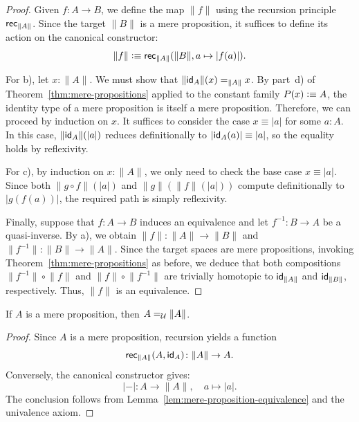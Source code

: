 \begin{proof}
    Given $f\colon A\to B$, we define the map $\lVert f\rVert$ using the recursion principle $\mathsf{rec}_{\lVert A\rVert}$. Since the target $\lVert B\rVert$ is a mere proposition, it suffices to define its action on the canonical constructor:
    \[
        \lVert f\rVert\mathrel{\vcentcolon}\equiv\mathsf{rec}_{\lVert A\rVert}(\lVert B\rVert,a\mapsto\lvert f(a)\rvert).
    \]
    
    For b), let $x\colon\lVert A\rVert$. We must show that $\lVert\mathsf{id}_A\rVert(x)\mathrel{=_{\lVert A\rVert}}x$. By part~d) of Theorem~\ref{thm:mere-propositions} applied to the constant family $P(x)\mathrel{\vcentcolon}\equiv A$, the identity type of a mere proposition is itself a mere proposition. Therefore, we can proceed by induction on $x$. It suffices to consider the case $x\equiv\lvert a\rvert$ for some $a\colon A$. In this case, $\lVert\mathsf{id}_A\rVert(\lvert a\rvert)$ reduces definitionally to $\lvert\mathsf{id}_A(a)\rvert\equiv\lvert a\rvert$, so the equality holds by reflexivity.

    For c), by induction on $x\colon\lVert A\rVert$, we only need to check the base case $x\equiv\lvert a\rvert$. Since both $\lVert g\circ f\rVert(\lvert a\rvert)$ and $\lVert g\rVert(\lVert f\rVert(\lvert a\rvert))$ compute definitionally to $\lvert g(f(a))\rvert$, the required path is simply reflexivity.

    Finally, suppose that $f\colon A\to B$ induces an equivalence and let $f^{-1}\colon B\to A$ be a quasi-inverse. By a), we obtain $\lVert f\rVert\colon\lVert A\rVert\to\lVert B\rVert$ and $\lVert f^{-1}\rVert\colon\lVert B\rVert\to\lVert A\rVert$. Since the target spaces are mere propositions, invoking Theorem~\ref{thm:mere-propositions} as before, we deduce that both compositions $\lVert f^{-1}\rVert\circ\lVert f\rVert$ and $\lVert f\rVert\circ\lVert f^{-1}\rVert$ are trivially homotopic to $\mathsf{id}_{\lVert A\rVert}$ and $\mathsf{id}_{\lVert B\rVert}$, respectively. Thus, $\lVert f\rVert$ is an equivalence.
    
\end{proof}

\begin{lem}\ua\label{lem:mere-propositions-are-truncated}
    If $A$ is a mere proposition, then $A\mathrel{=_{\mathcal U}}\lVert A\rVert$.
\end{lem}

\begin{proof}
    Since $A$ is a mere proposition, recursion yields a function
    \[
        \fun{rec}_{\lVert A\rVert}(A,\id_A)\colon\lVert A\rVert\to A.
    \]
    Conversely, the canonical constructor gives:
    \[
        \lvert{-}\rvert\colon A\to\lVert A\rVert,\quad a\mapsto\lvert a\rvert.
    \]
    The conclusion follows from Lemma~\ref{lem:mere-proposition-equivalence} and the univalence axiom.
\end{proof}

